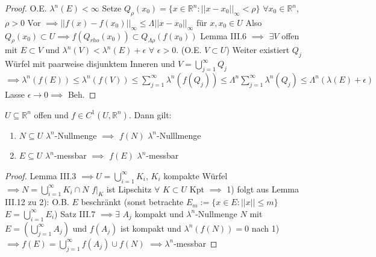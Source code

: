     \begin{proof}
	O.E. $\lambda^n(E) < \infty$ \newline
	Setze $Q_{\rho}(x_0) = \{x\in\mathbb{R}^n: ||x-x_0||_{\infty} < \rho\}$ $\forall x_0\in\mathbb{R}^n$, $\rho >0$ \newline
	Vor $\implies ||f(x)-f(x_0)||_{\infty} \leq \Lambda ||x-x_0||_{\infty}$ für $x,x_0\in U$ \newline
	Also $Q_{\rho}(x_0) \subset U \implies f(Q_{rho}(x_0)) \subset Q_{\Lambda \rho}(f(x_0))$ \newline
	Lemma III.6 $\implies$ $\exists V$ offen mit $E\subset V$ und $\lambda^n(V) < \lambda^n(E) + \epsilon$ $\forall$ $\epsilon >0$. \newline
	(O.E. $V\subset U$) \newline 
	Weiter existiert $Q_j$ Würfel mit paarweise disjunktem Inneren und $V = \bigcup\limits_{j=1}^{\infty}Q_j$ \newline
	$\implies \lambda^n(f(E)) \leq \lambda^n(f(V)) \leq \sum\limits_{j=1}^{\infty}\lambda^n(f(Q_j)) \leq \Lambda^n \sum\limits_{j=1}^{\infty}\lambda^n(Q_j) \leq \Lambda^n(\lambda(E)+\epsilon)$ \newline
	Lasse $\epsilon\to 0 \implies$ Beh. 
\end{proof}

  \begin{theorem}
    $U \subseteq \mathbb{R}^n$ offen und $f \in C^1(U, \mathbb{R}^n)$. Dann gilt:
    \begin{enumerate}
      \item $N \subseteq U$ $\lambda^n$-Nullmenge $\implies$ $f(N)$ $\lambda^n$-Nulllmenge
      \item $E \subseteq U$ $\lambda^n$-messbar $\implies$ $f(E)$ $\lambda^n$-messbar
    \end{enumerate}
  \end{theorem}

    \begin{proof}
	Lemma III.3 $\implies U = \bigcup\limits_{i=1}^{\infty}K_i$, $K_i$ kompakte Würfel \newline
	$\implies N = \bigcup\limits_{i=1}^{\infty}K_i\cap N$ \newline
	$f|_K$ ist Lipschitz $\forall$ $K\subset U$ Kpt \newline
	$\implies$ 1) folgt aus Lemma III.12 \newline
	zu 2): O.B. $E$ beschränkt (sonst betrachte $E_m := \{x\in E: ||x||\leq m \}$ $E = \bigcup\limits_{i=1}^{\infty}E_i$)  \newline
	Satz III.7 $\implies \exists$ $A_j$ kompakt und $\lambda^n$-Nullmenge $N$ mit $E=(\bigcup\limits_{j=1}^{\infty}A_j)$ und $f(A_j)$ ist kompakt und $\lambda^n(f(N)) = 0$ nach 1) \newline
	$\implies f(E) = \bigcup\limits_{j=1}^{\infty}f(A_j) \cup f(N)$ $\implies \lambda^n$-messbar
\end{proof}

